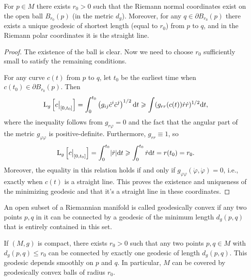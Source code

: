 \begin{cor}
    For $p\in M$ there exists $r_0>0$ such that the Riemann normal coordinates exist on the open ball $B_{r_0}(p)$ (in the metric $d_g$). Moreover, for any $q\in \partial B_{r_0}(p)$ there exists a unique geodesic of shortest length (equal to $r_0$) from $p$ to $q$, and in the Riemann polar coordinates it is the straight line.
\end{cor}
\begin{proof}
    The existence of the ball is clear. Now we need to choose $r_0$ sufficiently small to satisfy the remaining conditions.
    
    For any curve $c(t)$ from $p$ to $q$, let $t_0$ be the earliest time when $c(t_0)\in \partial B_{r_0}(p)$. Then
    \[\rmL_g\left[\restr{c}{[0,t_0]}\right]=\int_0^{t_0} \left(g_{ij}\dot c^i\dot c^j\right)^{1/2}\dd t\geq \int (g_{rr}(c(t))\dot r\dot r)^{1/2}\dd t,\]
    where the inequality follows from $g_{r\varphi}=0$ and the fact that the angular part of the metric $g_{\varphi\varphi}$ is positive-definite. Furthermore, $g_{rr}\equiv1$, so
    \[\rmL_g\left[\restr{c}{[0,t_0]}\right]=\int_0^{t_0}\lvert \dot r\rvert\dd t\geq \int_0^{t_0}\dot r\dd t=r(t_0)=r_0.\]
    Moreover, the equality in this relation holds if and only if $g_{\varphi\varphi}(\dot\varphi,\dot\varphi)=0$, i.e., exactly when $c(t)$ is a straight line. This proves the existence and uniqueness of the minimizing geodesic and that it's a straight line in these coordinates.
\end{proof}

\begin{defn}
    An open subset of a Riemannian manifold is called geodesically convex if any two points $p,q$ in it can be connected by a geodesic of the minimum length $d_g(p,q)$ that is entirely contained in this set.
\end{defn}

\begin{cor}
    If $(M,g)$ is compact, there exists $r_0>0$ such that any two points $p,q\in M$ with $d_g(p,q)\leq r_0$ can be connected by exactly one geodesic of length $d_g(p,q)$. This geodesic depends smoothly on $p$ and $q$. In particular, $M$ can be covered by geodesically convex balls of radius $r_0$.
\end{cor}

